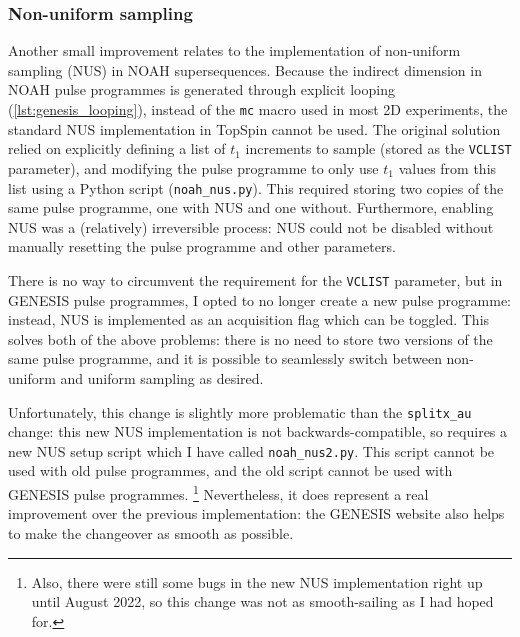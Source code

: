 \subsubsection{Non-uniform sampling}

Another small improvement relates to the implementation of non-uniform sampling (NUS) in NOAH supersequences.
Because the indirect dimension in NOAH pulse programmes is generated through explicit looping (\cref{lst:genesis_looping}), instead of the \texttt{mc} macro used in most 2D experiments, the standard NUS implementation in TopSpin cannot be used.
The original solution\autocite{Claridge2019MRC} relied on explicitly defining a list of $t_1$ increments to sample (stored as the \texttt{VCLIST} parameter), and modifying the pulse programme to only use $t_1$ values from this list using a Python script (\texttt{noah\_nus.py}).
This required storing two copies of the same pulse programme, one with NUS and one without.
Furthermore, enabling NUS was a (relatively) irreversible process: NUS could not be disabled without manually resetting the pulse programme and other parameters.

There is no way to circumvent the requirement for the \texttt{VCLIST} parameter, but in GENESIS pulse programmes, I opted to no longer create a new pulse programme: instead, NUS is implemented as an acquisition flag which can be toggled.
This solves both of the above problems: there is no need to store two versions of the same pulse programme, and it is possible to seamlessly switch between non-uniform and uniform sampling as desired.%

Unfortunately, this change is slightly more problematic than the \texttt{splitx\_au} change: this new NUS implementation is not backwards-compatible, so requires a new NUS setup script which I have called \texttt{noah\_nus2.py}.
This script cannot be used with old pulse programmes, and the old script cannot be used with GENESIS pulse programmes.%
\footnote{Also, there were still some bugs in the new NUS implementation right up until August 2022, so this change was not as smooth-sailing as I had hoped for.}
Nevertheless, it does represent a real improvement over the previous implementation: the GENESIS website also helps to make the changeover as smooth as possible.
